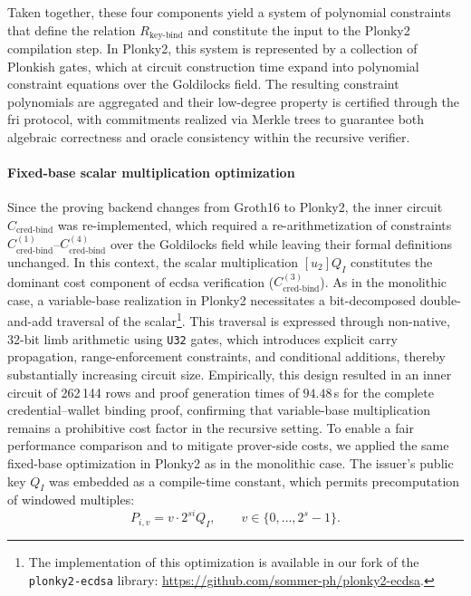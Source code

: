 \medskip
Taken together, these four components yield a system of polynomial constraints that define the relation $R_{\text{key-bind}}$ and constitute the input to the Plonky2 compilation step. In Plonky2, this system is represented by a collection of Plonkish gates, which at circuit construction time expand into polynomial constraint equations over the Goldilocks field. The resulting constraint polynomials are aggregated and their low-degree property is certified through the \acrshort{fri} protocol, with commitments realized via Merkle trees to guarantee both algebraic correctness and oracle consistency within the recursive verifier.

\paragraph{Fixed-base scalar multiplication optimization}
Since the proving backend changes from Groth16 to Plonky2, the inner circuit $C_{\text{cred-bind}}$ was re-implemented, which required a re-arithmetization of constraints $C_{\text{cred-bind}}^{(1)}$–$C_{\text{cred-bind}}^{(4)}$ over the Goldilocks field while leaving their formal definitions unchanged. In this context, the scalar multiplication $[u_2]Q_I$ constitutes the dominant cost component of \acrshort{ecdsa} verification ($C_{\text{cred-bind}}^{(3)}$). As in the monolithic case, a variable-base realization in Plonky2 necessitates a bit-decomposed double-and-add traversal of the scalar\footnote{The implementation of this optimization is available in our fork of the \texttt{plonky2-ecdsa} library: \url{https://github.com/sommer-ph/plonky2-ecdsa}.}. This traversal is expressed through non-native, 32-bit limb arithmetic using \texttt{U32} gates, which introduces explicit carry propagation, range-enforcement constraints, and conditional additions, thereby substantially increasing circuit size. Empirically, this design resulted in an inner circuit of 262\,144 rows and proof generation times of $94.48$\,s for the complete credential–wallet binding proof, confirming that variable-base multiplication remains a prohibitive cost factor in the recursive setting. To enable a fair performance comparison and to mitigate prover-side costs, we applied the same fixed-base optimization in Plonky2 as in the monolithic case. The issuer’s public key $Q_I$ was embedded as a compile-time constant, which permits precomputation of windowed multiples:
\[
P_{i,v} = v \cdot 2^{si} Q_I, \qquad v \in \{0,\dots,2^s-1\}.
\]  
